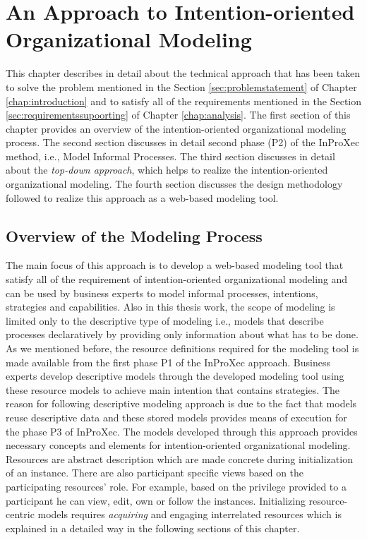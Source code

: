 \chapter{An Approach to Intention-oriented Organizational Modeling}
\label{chap:approach}
This chapter describes in detail about the technical approach that has been taken to solve the problem mentioned in the Section \ref{sec:problemstatement} of Chapter \ref{chap:introduction} and to satisfy all of the requirements mentioned in the Section \ref{sec:requirementssupoorting} of Chapter \ref{chap:analysis}. The first section of this chapter provides an overview of the intention-oriented organizational modeling process. The second section discusses in detail second phase (P2) of the InProXec method, i.e., Model Informal Processes. The third section discusses in detail about the \textit{top-down approach}, which helps to realize the intention-oriented organizational modeling. The fourth section discusses the design methodology followed to realize this approach as a web-based modeling tool. 

\section{Overview of the Modeling Process}
\label{sec:overviewmodelingprocess}
The main focus of this approach is to develop a web-based modeling tool that satisfy all of the requirement of intention-oriented organizational modeling and can be used by business experts to model informal processes, intentions, strategies and capabilities. Also in this thesis work, the scope of modeling is limited only to the descriptive type of modeling i.e., models that describe processes declaratively by providing only information about what has to be done. As we mentioned before, the resource definitions required for the modeling tool is made available from the first phase P1 of the InProXec approach. Business experts develop descriptive models through the developed modeling tool using these resource models to achieve main intention that contains strategies. The reason for following descriptive modeling approach is due to the fact that models reuse descriptive data and these stored models provides means of execution for the phase P3 of InProXec. The models developed through this approach provides necessary concepts and elements for intention-oriented organizational modeling. Resources are abstract description which are made concrete during initialization of an instance. There are also participant specific views based on the participating resources' role. For example, based on the privilege provided to a participant he can view, edit, own or follow the instances. Initializing resource-centric models requires \textit{acquiring} and engaging interrelated resources \cite{Sungur2015} which is explained in a detailed way in the following sections of this chapter. 

